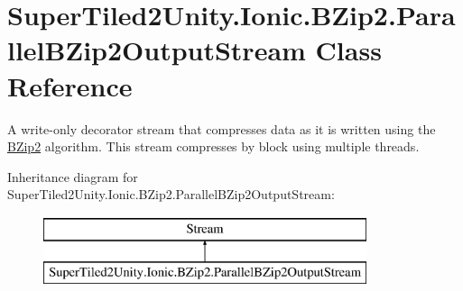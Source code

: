 \hypertarget{class_super_tiled2_unity_1_1_ionic_1_1_b_zip2_1_1_parallel_b_zip2_output_stream}{}\section{Super\+Tiled2\+Unity.\+Ionic.\+B\+Zip2.\+Parallel\+B\+Zip2\+Output\+Stream Class Reference}
\label{class_super_tiled2_unity_1_1_ionic_1_1_b_zip2_1_1_parallel_b_zip2_output_stream}


A write-\/only decorator stream that compresses data as it is written using the \mbox{\hyperlink{namespace_super_tiled2_unity_1_1_ionic_1_1_b_zip2}{B\+Zip2}} algorithm. This stream compresses by block using multiple threads.  


Inheritance diagram for Super\+Tiled2\+Unity.\+Ionic.\+B\+Zip2.\+Parallel\+B\+Zip2\+Output\+Stream\+:\begin{figure}[H]
\begin{center}
\leavevmode
\includegraphics[height=2.000000cm]{class_super_tiled2_unity_1_1_ionic_1_1_b_zip2_1_1_parallel_b_zip2_output_stream}
\end{center}
\end{figure}
